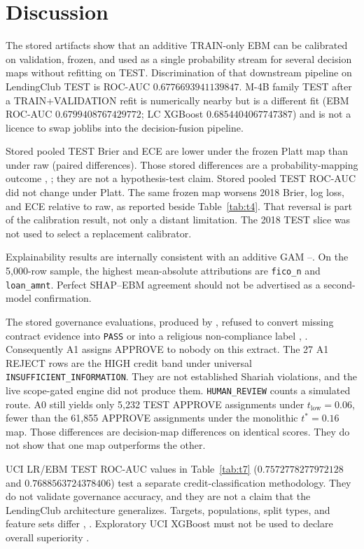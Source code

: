 \documentclass{ieeeaccess}
\makeatletter
\DeclareRobustCommand{\sha}[1]{{\ttfamily\expandafter\@shaloop\detokenize{#1}\relax}}
\def\@shaloop#1{%
  \ifx\relax#1\else#1\allowbreak\expandafter\@shaloop\fi}
\makeatother
\begin{document}
\section{Discussion}

The stored artifacts show that an additive TRAIN-only EBM can be calibrated on validation, frozen, and used as a single probability stream for several decision maps without refitting on TEST. Discrimination of that downstream pipeline on LendingClub TEST is ROC-AUC \(0.6776693941139847\). M-4B family TEST after a TRAIN+VALIDATION refit is numerically nearby but is a different fit (EBM ROC-AUC \(0.6799408767429772\); LC XGBoost \(0.6854404067747387\)) and is not a licence to swap joblibs into the decision-fusion pipeline.

Stored pooled TEST Brier and ECE are lower under the frozen Platt map than under raw (paired differences). Those stored differences are a probability-mapping outcome \cite{b14}, \cite{b15}; they are not a hypothesis-test claim. Stored pooled TEST ROC-AUC did not change under Platt. The same frozen map worsens 2018 Brier, log loss, and ECE relative to raw, as reported beside Table~\ref{tab:t4}. That reversal is part of the calibration result, not only a distant limitation. The 2018 TEST slice was not used to select a replacement calibrator.

Explainability results are internally consistent with an additive GAM \cite{b9}--\cite{b12}. On the 5,000-row sample, the highest mean-absolute attributions are \texttt{fico\_n} and \texttt{loan\_amnt}. Perfect SHAP--EBM agreement should not be advertised as a second-model confirmation.

The stored governance evaluations, produced by \sha{stage7-shariah-engine-v1}, refused to convert missing contract evidence into \texttt{PASS} or into a religious non-compliance label \cite{b26}, \cite{b27}. Consequently A1 assigns APPROVE to nobody on this extract. The 27 A1 REJECT rows are the HIGH credit band under universal \texttt{INSUFFICIENT\_INFORMATION}. They are not established Shariah violations, and the live scope-gated engine did not produce them. \texttt{HUMAN\_REVIEW} counts a simulated route. A0 still yields only 5,232 TEST APPROVE assignments under \(t_{\text{low}}=0.06\), fewer than the 61,855 APPROVE assignments under the monolithic \(t^{*}=0.16\) map. Those differences are decision-map differences on identical scores. They do not show that one map outperforms the other.

UCI LR/EBM TEST ROC-AUC values in Table~\ref{tab:t7} (\(0.7572778277972128\) and \(0.7688563724378406\)) test a separate credit-classification methodology. They do not validate governance accuracy, and they are not a claim that the LendingClub architecture generalizes. Targets, populations, split types, and feature sets differ \cite{b4}, \cite{b21}. Exploratory UCI XGBoost must not be used to declare overall superiority \cite{b18}.
\end{document}
